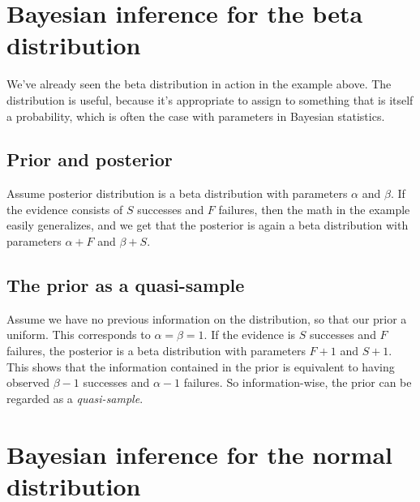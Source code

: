 \documentclass[12pt, a4paper]{article}
\begin{document}

\section{Bayesian inference for the beta distribution}
We've already seen the beta distribution in action in the example above. The distribution is useful, because it's appropriate to assign to something that is itself a probability, which is often the case with parameters in Bayesian statistics.

\subsection{Prior and posterior}
Assume posterior distribution is a beta distribution with parameters $\alpha$ and $\beta$. If the evidence consists of $S$ successes and $F$ failures, then the math in the example easily generalizes, and we get that the posterior is again a beta distribution with parameters $\alpha+F$ and $\beta+S$.

\subsection{The prior as a quasi-sample}
Assume we have no previous information on the distribution, so that our prior a uniform. This corresponds to $\alpha=\beta=1$. If the evidence is $S$ successes and $F$ failures, the posterior is a beta distribution with parameters $F+1$ and $S+1$. This shows that the information contained in the prior is equivalent to having observed $\beta-1$ successes and $\alpha-1$ failures. So information-wise, the prior can be regarded as a \textit{quasi-sample}.

\section{Bayesian inference for the normal distribution}
\end{document}
